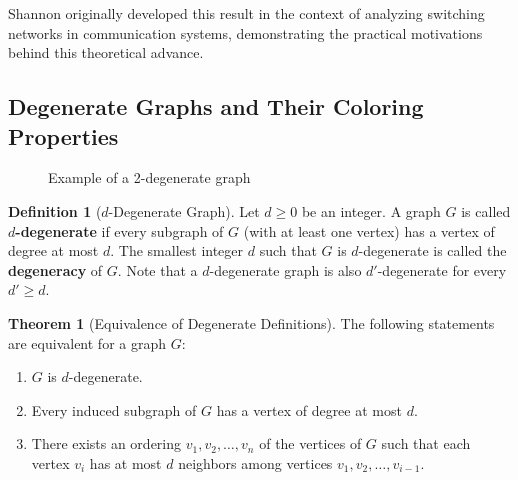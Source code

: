 \documentclass{article}
\theoremstyle{definition}
\newtheorem{theorem}{Theorem}
\newtheorem{definition}{Definition}
\begin{document}
Shannon originally developed this result in the context of analyzing switching networks in communication systems, demonstrating the practical motivations behind this theoretical advance.

\subsection{Degenerate Graphs and Their Coloring Properties}


\begin{figure}[ht]
\centering
{}
\caption{Example of a 2-degenerate graph}
\label{fig:2degenerate}
\end{figure}

\begin{definition}[$d$-Degenerate Graph]
Let $d \geq 0$ be an integer. A graph $G$ is called \textbf{$d$-degenerate} if every subgraph of $G$ (with at least one vertex) has a vertex of degree at most $d$. The smallest integer $d$ such that $G$ is $d$-degenerate is called the \textbf{degeneracy} of $G$. Note that a $d$-degenerate graph is also $d'$-degenerate for every $d' \geq d$.
\end{definition}

\begin{theorem}[Equivalence of Degenerate Definitions]
The following statements are equivalent for a graph $G$:
\begin{enumerate}
    \item $G$ is $d$-degenerate.
    \item Every induced subgraph of $G$ has a vertex of degree at most $d$.
    \item There exists an ordering $v_1, v_2, \ldots, v_n$ of the vertices of $G$ such that each vertex $v_i$ has at most $d$ neighbors among vertices $v_1, v_2, \ldots, v_{i-1}$.
\end{enumerate}
\end{theorem}
\end{document}
